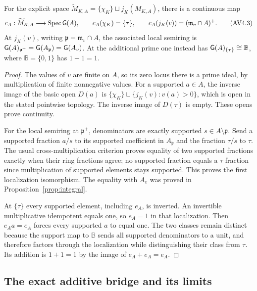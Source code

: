 \begin{proposition}
\label{prop:centermap}
For the explicit space
$\widetilde M_{K,A}=\{\chi_K\}\sqcup j_K(M_{K,A})$, there is a
continuous map
\[
 c_A:\widetilde M_{K,A}\longrightarrow\operatorname{Spec}\mathsf G(A),\qquad
 c_A(\chi_K)=\{\tau\},\qquad
 c_A(j_K(v))=(\mathfrak m_v\cap A)^+.
 \tag{AV4.3}\label{eq:center-map}
\]
At $j_K(v)$, writing $\mathfrak p=\mathfrak m_v\cap A$, the associated
local semiring is $\mathsf G(A)_{\mathfrak p^+}=\mathsf G(A_{\mathfrak p})=\mathsf G(A_v)$.
At the additional prime one instead has
$\mathsf G(A)_{\{\tau\}}\cong\mathbb B$, where
$\mathbb B=\{0,1\}$ has $1+1=1$.
\end{proposition}
\begin{proof}
The values of $v$ are finite on $A$, so its zero locus there is a prime
ideal, by multiplication of finite nonnegative values. For a supported
$a\in A$, the inverse image of the basic open $D(a)$ is
$\{\chi_K\}\sqcup\{j_K(v):v(a)>0\}$, which is open in the stated
pointwise topology. The inverse image of $D(\tau)$ is empty. These
opens prove continuity.

For the local semiring at $\mathfrak p^+$, denominators are exactly
supported $s\in A\setminus\mathfrak p$. Send a supported fraction
$a/s$ to its supported coefficient in $A_{\mathfrak p}$ and the
fraction $\tau/s$ to $\tau$. The usual cross-multiplication criterion
proves equality of two supported fractions exactly when their ring
fractions agree; no supported fraction equals a $\tau$ fraction since
multiplication of supported elements stays supported. This proves the
first localization isomorphism. The equality with $A_v$ was proved in
Proposition~\ref{prop:integral}.

At $\{\tau\}$ every supported element, including $e_A$, is inverted.
An invertible multiplicative idempotent equals one, so $e_A=1$ in that
localization. Then $e_Aa=e_A$ forces every supported $a$ to equal one.
The two classes remain distinct because the support map to $\mathbb B$
sends all supported denominators to a unit, and therefore factors
through the localization while distinguishing their class from $\tau$.
Its addition is $1+1=1$ by the image of $e_A+e_A=e_A$.
\end{proof}

\subsection{The exact additive bridge and its limits}

